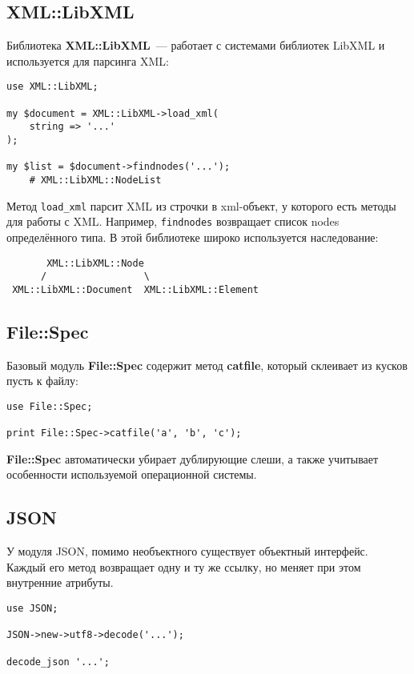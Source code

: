 \subsection{XML::LibXML}%
Библиотека \textbf{XML::LibXML}~--- работает с системами библиотек LibXML и используется для парсинга XML:
\begin{verbatim}
use XML::LibXML;

my $document = XML::LibXML->load_xml(
    string => '...'
);

my $list = $document->findnodes('...');
    # XML::LibXML::NodeList
\end{verbatim}

Метод \verb|load_xml| парсит XML из строчки в xml-объект, у которого есть методы для работы с XML. Например, \verb|findnodes| возвращает список nodes определённого типа. В этой библиотеке широко используется наследование:
\begin{verbatim}
       XML::LibXML::Node
      /                 \
 XML::LibXML::Document  XML::LibXML::Element
\end{verbatim}

\subsection{File::Spec}%
Базовый модуль \textbf{File::Spec} содержит метод \textbf{catfile}, который склеивает из кусков пусть к файлу:
\begin{verbatim}
use File::Spec;

print File::Spec->catfile('a', 'b', 'c');
\end{verbatim}
\textbf{File::Spec} автоматически убирает дублирующие слеши, а также учитывает особенности используемой операционной системы.

\subsection{JSON} %
У модуля JSON, помимо необъектного существует объектный интерфейс.
Каждый его метод возвращает одну и ту же ссылку, но меняет при этом внутренние атрибуты.
\begin{verbatim}
use JSON;

JSON->new->utf8->decode('...');

decode_json '...';
\end{verbatim}


